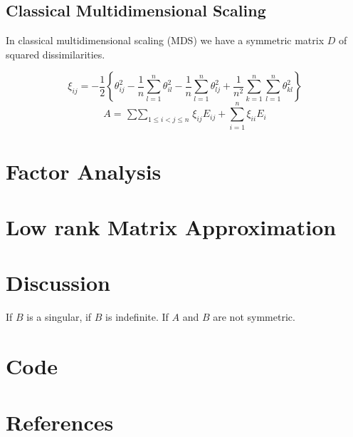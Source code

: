 \documentclass[
  12pt,
  letterpaper,
  DIV=11,
  numbers=noendperiod]{scrartcl}
\begin{document}
\subsection{Classical Multidimensional
Scaling}\label{classical-multidimensional-scaling}

In classical multidimensional scaling (MDS) we have a symmetric matrix
\(D\) of squared dissimilarities.

\[
\xi_{ij}=-\frac12\left\{\theta_{ij}^2-\frac{1}{n}\sum_{l=1}^n\theta_{il}^2-\frac{1}{n}\sum_{l=1}^n\theta_{lj}^2
+\frac{1}{n^2}\sum_{k=1}^n\sum_{l=1}^n\theta_{kl}^2\right\}
\] \[
A=\mathop{\sum\sum}_{1\leq i<j\leq n}\xi_{ij}E_{ij}+\sum_{i=1}^n\xi_{ii}E_i
\]

\section{Factor Analysis}\label{sec-fa}

\section{Low rank Matrix Approximation}\label{sec-rank}

\section{Discussion}\label{sec-discussion}

If \(B\) is a singular, if \(B\) is indefinite. If \(A\) and \(B\) are
not symmetric.

\section{Code}\label{sec-code}

\section*{References}\label{sec-references}
\end{document}
